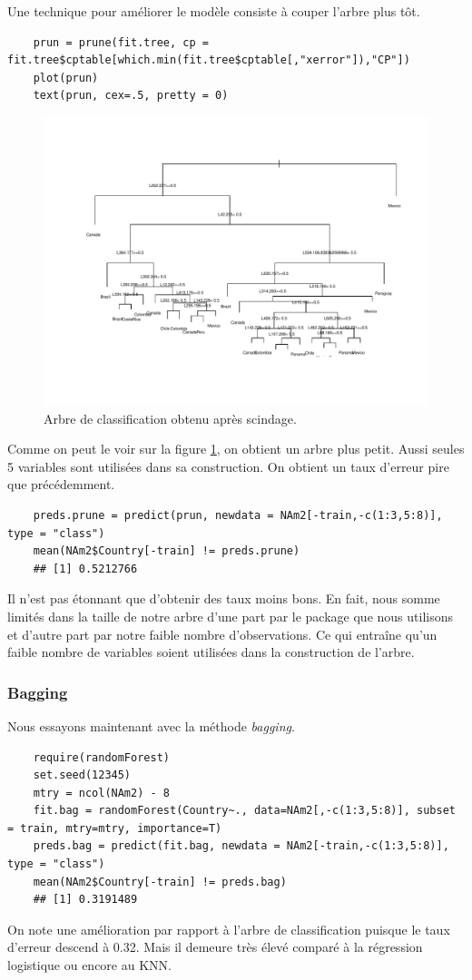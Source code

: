 \documentclass[12pt,a4paper]{article}
\begin{document}
Une technique pour améliorer le modèle consiste à couper l'arbre plus tôt.\vspace{2mm}
\begin{lstlisting}
	prun = prune(fit.tree, cp = fit.tree$cptable[which.min(fit.tree$cptable[,"xerror"]),"CP"])
	plot(prun)
	text(prun, cex=.5, pretty = 0)
\end{lstlisting}
\begin{figure}[h!]
	\begin{center}
		\includegraphics[scale=0.6]{figures/tree.pdf}
		\caption{Arbre de classification obtenu après scindage.}
		\label{fig:prune_tree}
	\end{center}
\end{figure}
Comme on peut le voir sur la figure \ref{fig:prune_tree}, on obtient un arbre plus petit. Aussi seules 5 variables sont utilisées dans sa construction. On obtient un taux d'erreur pire que précédemment.\vspace{2mm}
\begin{lstlisting}
	preds.prune = predict(prun, newdata = NAm2[-train,-c(1:3,5:8)], type = "class")
	mean(NAm2$Country[-train] != preds.prune)
	## [1] 0.5212766
\end{lstlisting}
Il n'est pas étonnant que d'obtenir des taux moins bons. En fait, nous somme limités dans la taille de notre arbre d'une part par le package que nous utilisons et d'autre part par notre faible nombre d'observations. Ce qui entraîne qu'un faible nombre de variables soient utilisées dans la construction de l'arbre.
\subsubsection{Bagging}
Nous essayons maintenant avec la méthode \textit{bagging}.
\begin{lstlisting}
	require(randomForest)
	set.seed(12345)
	mtry = ncol(NAm2) - 8
	fit.bag = randomForest(Country~., data=NAm2[,-c(1:3,5:8)], subset = train, mtry=mtry, importance=T)
	preds.bag = predict(fit.bag, newdata = NAm2[-train,-c(1:3,5:8)], type = "class")
	mean(NAm2$Country[-train] != preds.bag)
	## [1] 0.3191489
\end{lstlisting}
On note une amélioration par rapport à l'arbre de classification puisque le taux d'erreur descend à 0.32. Mais il demeure très élevé comparé à la régression logistique ou encore au KNN.
\end{document}
